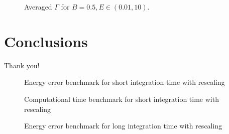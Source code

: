 \documentclass{beamer}
\begin{document}
\begin{frame}
	\begin{figure}
		
		\caption{Averaged \(\Gamma\) for \(B=0.5, E \in (0.01, 10)\).}
	\end{figure}
\end{frame}


\section{Conclusions}

\begin{frame}[standout]
Thank you!
\end{frame}

\appendix


\begin{frame}
	\begin{figure}
		
		\caption{Energy error benchmark for short integration time with rescaling}
	\end{figure}
\end{frame}


\begin{frame}
	\begin{figure}
		
		\caption{Computational time benchmark for short integration time with rescaling}
	\end{figure}
\end{frame}


\begin{frame}
	\begin{figure}
		
		\caption{Energy error benchmark for long integration time with rescaling}
	\end{figure}
\end{frame}

\end{document}
